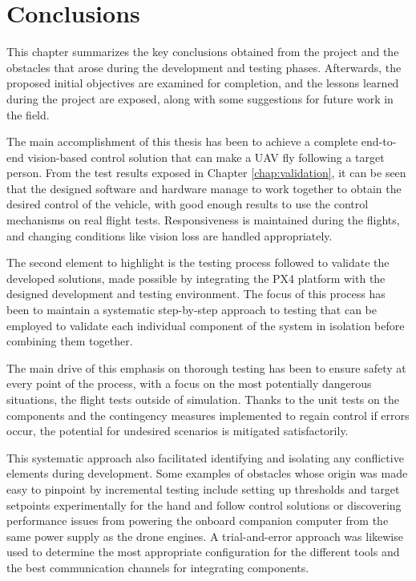 \chapter{Conclusions}
\label{chap:conclusion}

This chapter summarizes the key conclusions obtained from the project and the obstacles that arose during the development and testing phases. Afterwards, the proposed initial objectives are examined for completion, and the lessons learned during the project are exposed, along with some suggestions for future work in the field.

The main accomplishment of this thesis has been to achieve a complete end-to-end vision-based control solution that can make a UAV fly following a target person. From the test results exposed in Chapter \ref{chap:validation}, it can be seen that the designed software and hardware manage to work together to obtain the desired control of the vehicle, with good enough results to use the control mechanisms on real flight tests. Responsiveness is maintained during the flights, and changing conditions like vision loss are handled appropriately.

The second element to highlight is the testing process followed to validate the developed solutions, made possible by integrating the PX4 platform with the designed development and testing environment. The focus of this process has been to maintain a systematic step-by-step approach to testing that can be employed to validate each individual component of the system in isolation before combining them together. 

The main drive of this emphasis on thorough testing has been to ensure safety at every point of the process, with a focus on the most potentially dangerous situations, the flight tests outside of simulation. Thanks to the unit tests on the components and the contingency measures implemented to regain control if errors occur, the potential for undesired scenarios is mitigated satisfactorily.

This systematic approach also facilitated identifying and isolating any conflictive elements during development. Some examples of obstacles whose origin was made easy to pinpoint by incremental testing include setting up thresholds and target setpoints experimentally for the hand and follow control solutions or discovering performance issues from powering the onboard companion computer from the same power supply as the drone engines. A trial-and-error approach was likewise used to determine the most appropriate configuration for the different tools and the best communication channels for integrating components.


